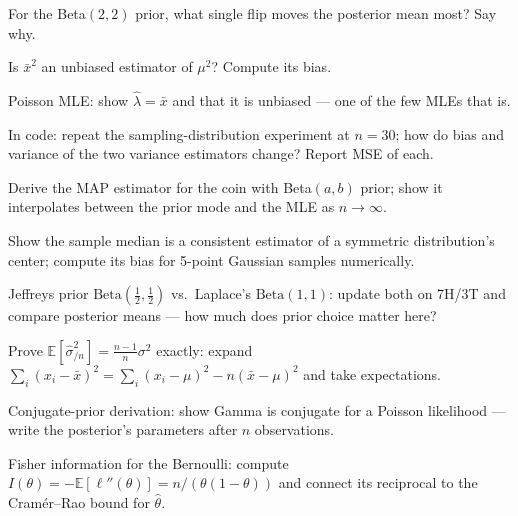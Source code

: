 \begin{exercise}[easy]
For the Beta$(2,2)$ prior, what single flip moves the posterior mean
most? Say why.
\end{exercise}

\begin{exercise}[easy]
Is $\bar x^{2}$ an unbiased estimator of $\mu^{2}$? Compute its bias.
\end{exercise}

\begin{exercise}[medium]
Poisson MLE: show $\hat\lambda=\bar x$ and that it is unbiased ---
one of the few MLEs that is.
\end{exercise}

\begin{exercise}[medium]
In code: repeat the sampling-distribution experiment at $n=30$; how do
bias and variance of the two variance estimators change? Report MSE of
each.
\end{exercise}

\begin{exercise}[medium]
Derive the MAP estimator for the coin with Beta$(a,b)$ prior; show it
interpolates between the prior mode and the MLE as $n\to\infty$.
\end{exercise}

\begin{exercise}[medium]
Show the sample median is a consistent estimator of a symmetric
distribution's center; compute its bias for 5-point Gaussian samples
numerically.
\end{exercise}

\begin{exercise}[medium]
Jeffreys prior $\mathrm{Beta}(\tfrac12,\tfrac12)$ vs.\ Laplace's
$\mathrm{Beta}(1,1)$: update both on 7H/3T and compare posterior means
--- how much does prior choice matter here?
\end{exercise}

\begin{exercise}[hard]
Prove $\mathbb E[\hat\sigma^{2}_{/n}]=\frac{n-1}{n}\sigma^{2}$ exactly:
expand $\sum_i(x_i-\bar x)^2=\sum_i(x_i-\mu)^2-n(\bar x-\mu)^2$ and take
expectations.
\end{exercise}

\begin{exercise}[hard]
Conjugate-prior derivation: show Gamma is conjugate for a Poisson
likelihood --- write the posterior's parameters after $n$ observations.
\end{exercise}

\begin{exercise}[hard]
Fisher information for the Bernoulli: compute
$I(\theta)=-\mathbb E[\ell''(\theta)]=n/(\theta(1-\theta))$ and connect
its reciprocal to the Cram\'er--Rao bound for $\hat\theta$.
\end{exercise}

